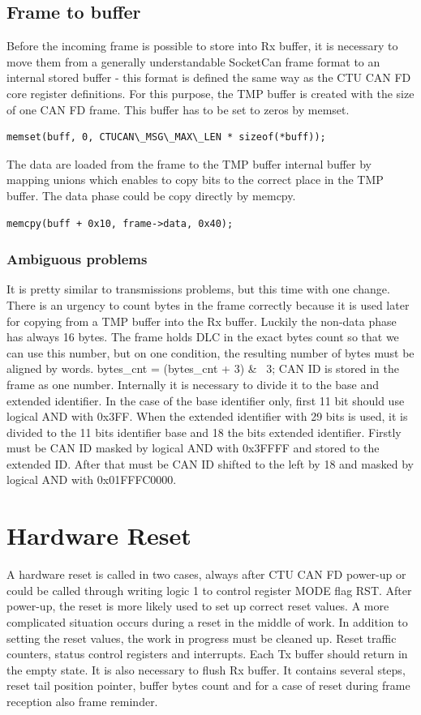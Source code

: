 \documentclass{ctuthesis}
\begin{document}
 \subsection{Frame to buffer}
  Before the incoming frame is possible to store into Rx buffer, it is necessary to move them from a generally understandable SocketCan frame format to an internal stored buffer - this format is defined the same way as the CTU CAN FD core register definitions. For this purpose, the TMP buffer is created with the size of one CAN FD frame. This buffer has to be set to zeros by memset.
  \begin{verbatim}memset(buff, 0, CTUCAN\_MSG\_MAX\_LEN * sizeof(*buff));\end{verbatim}
  The data are loaded from the frame to the TMP buffer internal buffer by mapping unions which enables to copy bits to the correct place in the TMP buffer. The data phase could be copy directly by memcpy.
  \begin{verbatim}memcpy(buff + 0x10, frame->data, 0x40);\end{verbatim}
 
  \subsubsection{Ambiguous problems}
   It is pretty similar to transmissions problems, but this time with one change. There is an urgency to count bytes in the frame correctly because it is used later for copying from a TMP buffer into the Rx buffer. Luckily the non-data phase has always 16 bytes. The frame holds DLC in the exact bytes count so that we can use this number, but on one condition, the resulting number of bytes must be aligned by words.
   bytes\_cnt = (bytes\_cnt + 3) \& ~3;
   CAN ID is stored in the frame as one number. Internally it is necessary to divide it to the base and extended identifier. In the case of the base identifier only, first 11 bit should use logical AND with 0x3FF. When the extended identifier with 29 bits is used, it is divided to the 11 bits identifier base and 18 the bits extended identifier. Firstly must be CAN ID masked by logical AND with 0x3FFFF and stored to the extended ID. After that must be CAN ID shifted to the left by 18 and masked by logical AND with 0x01FFFC0000.
  
 \section{Hardware Reset}
  A hardware reset is called in two cases, always after CTU CAN FD power-up or could be called through writing logic 1 to control register MODE flag RST. After power-up, the reset is more likely used to set up correct reset values. A more complicated situation occurs during a reset in the middle of work. In addition to setting the reset values, the work in progress must be cleaned up. Reset traffic counters, status control registers and interrupts. Each Tx buffer should return in the empty state. It is also necessary to flush Rx buffer. It contains several steps, reset tail position pointer, buffer bytes count and for a case of reset during frame reception also frame reminder.
 
\end{document}
